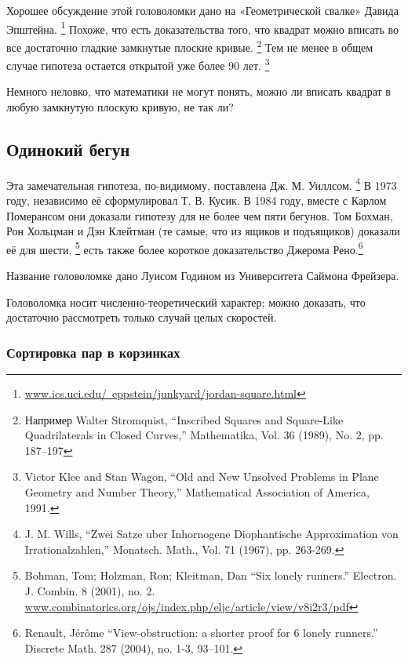 Хорошее обсуждение этой головоломки дано на «Геометрической свалке» Давида Эпштейна.%
\footnote{\href{http://www.ics.uci.edu/~eppstein/junkyard/jordan-square.html}{www.ics.uci.edu/~eppstein/junkyard/jordan-square.html}}
Похоже, что есть доказательства того, что квадрат можно вписать во все достаточно гладкие замкнутые плоские кривые.%
\footnote{Например Walter Stromquist, ``Inscribed Squares and Square-Like Quadrilaterals in Closed Curves,'' Mathematika, Vol. 36 (1989), No. 2, pp. 187--197}
Тем не менее в общем случае гипотеза остается открытой уже более 90 лет.
\footnote{Victor Klee and Stan Wagon, ``Old and New Unsolved Problems in Plane Geometry and Number Theory,'' Mathematical Association of America, 1991.}

\medskip

Немного неловко, что математики не могут понять, можно ли вписать квадрат в любую замкнутую плоскую кривую, не так ли?

\subsection*{Одинокий бегун}

Эта замечательная гипотеза, по-видимому, поставлена Дж. М. Уиллсом.%
\footnote{J. M. Wills, ``Zwei Satze uber Inhornogene Diophantische Approximation von Irrationalzahlen,'' Monatsch. Math., Vol. 71 (1967), pp. 263-269.}
В 1973 году, независимо её сформулировал Т. В. Кусик.
В 1984 году, вместе с Карлом Померансом они доказали гипотезу для не более чем пяти бегунов.
Том Бохман, Рон Хольцман и Дэн Клейтман (те самые, что из ящиков и подъящиков) доказали её для шести,%
\footnote{Bohman, Tom; Holzman, Ron; Kleitman, Dan
``Six lonely runners.''
Electron. J. Combin. 8 (2001), no. 2.\\
\href{https://www.combinatorics.org/ojs/index.php/eljc/article/view/v8i2r3/pdf}{www.combinatorics.org/ojs/index.php/eljc/article/view/v8i2r3/pdf}}
есть также более короткое доказательство Джерома Рено.\footnote{Renault, J\'{e}r\^{o}me ``View-obstruction: a shorter proof for 6 lonely runners.'' Discrete Math. 287 (2004), no. 1-3, 93--101.}

\medskip

Название головоломке дано Луисом Годином из Университета Саймона Фрейзера. %

Головоломка носит численно-теоретический характер;
можно доказать, что достаточно рассмотреть только случай целых скоростей.

\subsubsection*{Сортировка пар в корзинках}

